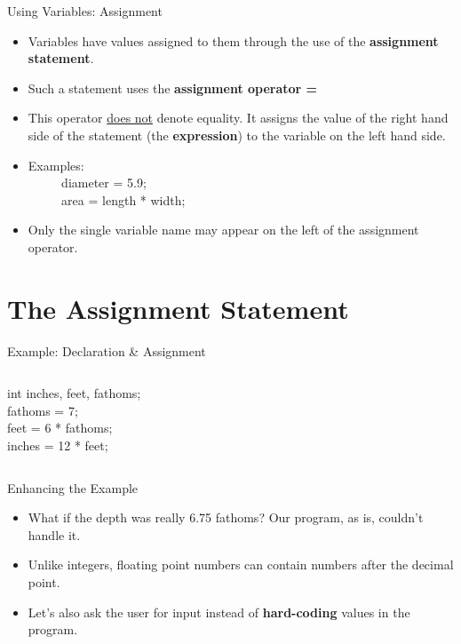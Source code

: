 \documentclass[graphics]{beamer}
\begin{document}
\begin{frame}{Using Variables: Assignment}
    \begin{itemize}
        \item Variables have values assigned to them through the use of the \textbf{assignment statement}.
        \item Such a statement uses the \textbf{assignment operator =}
        \item This operator \underline{does not} denote equality. It assigns the value of the right hand side of the statement (the \textbf{expression}) to the variable on the left hand side.
        \item Examples: \\
        ~~ ~~ diameter = 5.9; \\
        ~~ ~~ area = length * width;
        \item Only the single variable name may appear on the left of the assignment operator.
    \end{itemize}
\end{frame}

\section{The Assignment Statement}
\begin{frame}[fragile]{Example: Declaration \& Assignment}
    \begin{columns}
            int inches, feet, fathoms;
             {
                ~~ \\
                fathoms = 7; \\
                feet = 6 * fathoms; \\
                inches = 12 * feet; \\
            }
             {
                
            }
             {
                
            }
    \end{columns}
\end{frame}

\begin{frame}{Enhancing the Example}
    \begin{itemize}
        \item What if the depth was really 6.75 fathoms? Our program, as is, couldn't handle it.
        \item Unlike integers, floating point numbers can contain numbers after the decimal point.
        \item Let's also ask the user for input instead of \textbf{hard-coding} values in the program.
    \end{itemize}
\end{frame}
\end{document}
